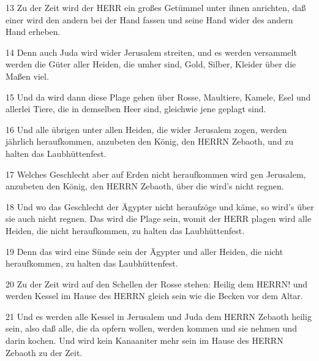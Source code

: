 \par 13 Zu der Zeit wird der HERR ein großes Getümmel unter ihnen anrichten, daß einer wird den andern bei der Hand fassen und seine Hand wider des andern Hand erheben.
\par 14 Denn auch Juda wird wider Jerusalem streiten, und es werden versammelt werden die Güter aller Heiden, die umher sind, Gold, Silber, Kleider über die Maßen viel.
\par 15 Und da wird dann diese Plage gehen über Rosse, Maultiere, Kamele, Esel und allerlei Tiere, die in demselben Heer sind, gleichwie jene geplagt sind.
\par 16 Und alle übrigen unter allen Heiden, die wider Jerusalem zogen, werden jährlich heraufkommen, anzubeten den König, den HERRN Zebaoth, und zu halten das Laubhüttenfest.
\par 17 Welches Geschlecht aber auf Erden nicht heraufkommen wird gen Jerusalem, anzubeten den König, den HERRN Zebaoth, über die wird's nicht regnen.
\par 18 Und wo das Geschlecht der Ägypter nicht heraufzöge und käme, so wird's über sie auch nicht regnen. Das wird die Plage sein, womit der HERR plagen wird alle Heiden, die nicht heraufkommen, zu halten das Laubhüttenfest.
\par 19 Denn das wird eine Sünde sein der Ägypter und aller Heiden, die nicht heraufkommen, zu halten das Laubhüttenfest.
\par 20 Zu der Zeit wird auf den Schellen der Rosse stehen: Heilig dem HERRN! und werden Kessel im Hause des HERRN gleich sein wie die Becken vor dem Altar.
\par 21 Und es werden alle Kessel in Jerusalem und Juda dem HERRN Zebaoth heilig sein, also daß alle, die da opfern wollen, werden kommen und sie nehmen und darin kochen. Und wird kein Kanaaniter mehr sein im Hause des HERRN Zebaoth zu der Zeit.

